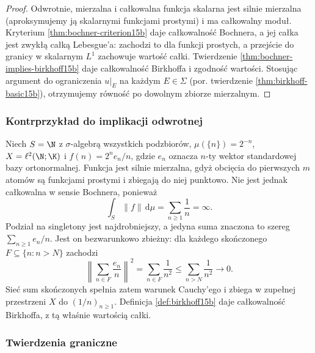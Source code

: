 \begin{proof}
Odwrotnie, mierzalna i całkowalna funkcja skalarna
jest silnie mierzalna (aproksymujemy ją skalarnymi
funkcjami prostymi) i ma całkowalny moduł.
Kryterium \ref{thm:bochner-criterion15b} daje
całkowalność Bochnera, a jej całka jest zwykłą całką
Lebesgue'a: zachodzi to dla funkcji prostych, a
przejście do granicy w skalarnym $L^1$ zachowuje
wartość całki. Twierdzenie
\ref{thm:bochner-implies-birkhoff15b} daje
całkowalność Birkhoffa i zgodność wartości.
Stosując argument do ograniczenia $u|_E$ na każdym
$E\in\Sigma$ (por. twierdzenie \ref{thm:birkhoff-basic15b}),
otrzymujemy równość po dowolnym zbiorze mierzalnym.
\end{proof}

\subsubsection{Kontrprzykład do implikacji odwrotnej}

\begin{przyklad}
\label{ex:birkhoff-not-bochner15b}
Niech $S=\N$ z $\sigma$-algebrą wszystkich podzbiorów,
$\mu(\{n\})=2^{-n}$, $X=\ell^2(\N;\K)$ i
$f(n)=2^ne_n/n$, gdzie $e_n$ oznacza $n$-ty wektor
standardowej bazy ortonormalnej.
Funkcja jest silnie mierzalna, gdyż obcięcia do
pierwszych $m$ atomów są funkcjami prostymi
i zbiegają do niej punktowo. Nie jest jednak
całkowalna w sensie Bochnera, ponieważ
\[
 \int_S\|f\|\,\mathrm d\mu=\sum_{n\ge1}\frac1n=\infty.
\]
Podział na singletony jest najdrobniejszy,
a jedyna suma znaczona to szereg $\sum_{n\ge1}e_n/n$.
Jest on bezwarunkowo zbieżny: dla każdego skończonego
$F\subseteq\{n:n>N\}$ zachodzi
\[
 \left\|\sum_{n\in F}\frac{e_n}{n}\right\|^2
 =\sum_{n\in F}\frac1{n^2}
 \le\sum_{n>N}\frac1{n^2}\longrightarrow0.
\]
Sieć sum skończonych spełnia zatem warunek Cauchy'ego
i zbiega w zupełnej przestrzeni $X$ do $(1/n)_{n\ge1}$.
Definicja \ref{def:birkhoff15b} daje całkowalność
Birkhoffa, z tą właśnie wartością całki.
\end{przyklad}

\subsubsection{Twierdzenia graniczne}

